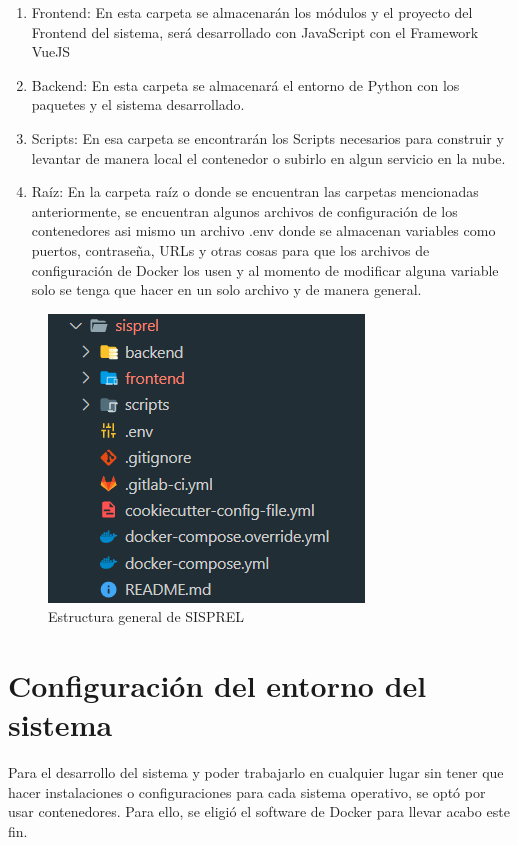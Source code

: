 \begin{enumerate}
    \item Frontend: En esta carpeta se almacenarán los módulos y el proyecto del Frontend del sistema, será desarrollado con JavaScript con el Framework VueJS
    \item Backend: En esta carpeta se almacenará el entorno de Python con los paquetes y el sistema desarrollado.
    \item Scripts: En esa carpeta se encontrarán los Scripts necesarios para construir y levantar de manera local el contenedor o subirlo en algun servicio en la nube.
    \item Raíz: En la carpeta raíz o donde se encuentran las carpetas mencionadas anteriormente, se encuentran algunos archivos de configuración de los contenedores asi mismo un archivo .env donde se almacenan variables como puertos, contraseña, URLs y otras cosas para que los archivos de configuración de Docker los usen y al momento de modificar alguna variable solo se tenga que hacer en un solo archivo y de manera general.
\end{enumerate}

\begin{figure}[!htb]
    \centering
    \includegraphics[scale=0.95]{TT/img/implementacion/carpetasGeneral.png}
    \caption{Estructura general de SISPREL}
    \label{graphic:carpetasGeneral}    
\end{figure}


\section{Configuración del entorno del sistema}
Para el desarrollo del sistema y poder trabajarlo en cualquier lugar sin tener que hacer instalaciones o configuraciones para cada sistema operativo, se optó por usar contenedores. Para ello, se eligió el software de Docker para llevar acabo este fin. 

